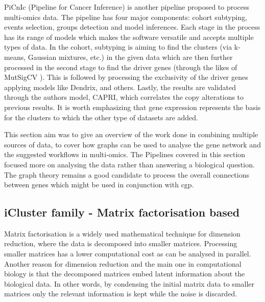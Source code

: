 
PiCnIc (Pipeline for Cancer Inference)\cite{Caravagna2016-vw} is another pipeline proposed to process multi-omics data. The pipeline has four major components: cohort subtyping, events selection, groups detection and model inferences\cite{Caravagna2016-vw}. Each stage in the process has its range of models which makes the software versatile and accepts multiple types of data. In the cohort, subtyping is aiming to find the clusters (via k-means, Gaussian mixtures, etc.) in the given data which are then further processed in the second stage to find the driver genes (through the likes of MutSigCV \cite{Lawrence2013-pl}). This is followed by processing the exclusivity of the driver genes applying models like Dendrix\cite{Vandin2012-cf}, \cite{Zhao2012-wj} and others. Lastly, the results are validated through the authors model, CAPRI, which correlates the copy alterations to previous results. It is worth emphasizing that gene expression represents the basis for the clusters to which the other type of datasets are added.


This section aim was to give an overview of the work done in combining multiple sources of data, to cover how graphs can be used to analyse the gene network and the suggested workflows in multi-omics. The Pipelines covered in this section focused more on analysing the data rather than answering a biological question. The graph theory remains a good candidate to process the overall connections between genes which might be used in conjunction with \acrlong{cgp}.


\subsection{iCluster family - Matrix factorisation based} \label{s:lit:iCluster}

Matrix factorisation is a widely used mathematical technique for dimension reduction, where the data is decomposed into smaller matrices. Processing smaller matrices has a lower computational cost as can be analysed in parallel. Another reason for dimension reduction and the main one in computational biology is that the decomposed matrices embed latent information about the biological data. In other words, by condensing the initial matrix data to smaller matrices only the relevant information is kept while the noise is discarded. 

